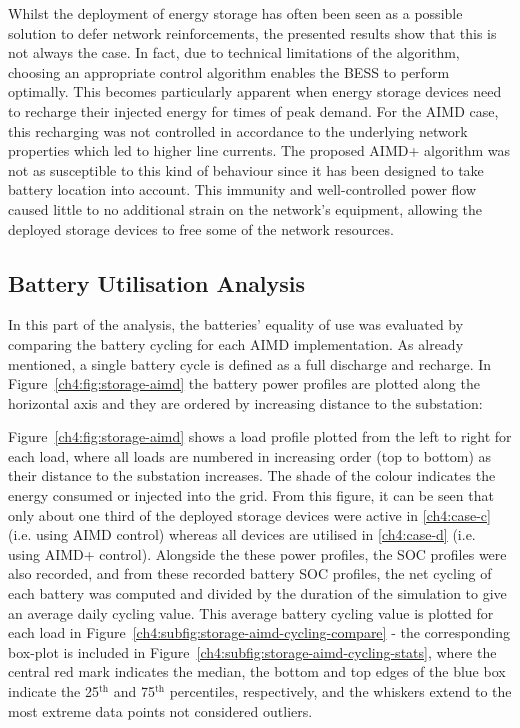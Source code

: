 Whilst the deployment of energy storage has often been seen as a possible solution to defer network reinforcements, the presented results show that this is not always the case.
In fact, due to technical limitations of the algorithm, choosing an appropriate control algorithm enables the BESS to perform optimally.
This becomes particularly apparent when energy storage devices need to recharge their injected energy for times of peak demand.
For the AIMD case, this recharging was not controlled in accordance to the underlying network properties which led to higher line currents.
The proposed AIMD+ algorithm was not as susceptible to this kind of behaviour since it has been designed to take battery location into account.
This immunity and well-controlled power flow caused little to no additional strain on the network's equipment, allowing the deployed storage devices to free some of the network resources.

\subsection{Battery Utilisation Analysis}

In this part of the analysis, the batteries' equality of use was evaluated by comparing the battery cycling for each AIMD implementation.
As already mentioned, a single battery cycle is defined as a full discharge and recharge.
In Figure~\ref{ch4:fig:storage-aimd} the battery power profiles are plotted along the horizontal axis and they are ordered by increasing distance to the substation:



Figure~\ref{ch4:fig:storage-aimd} shows a load profile plotted from the left to right for each load, where all loads are numbered in increasing order (top to bottom) as their distance to the substation increases.
The shade of the colour indicates the energy consumed or injected into the grid.
From this figure, it can be seen that only about one third of the deployed storage devices were active in \ref{ch4:case-c} (i.e. using AIMD control) whereas all devices are utilised in \ref{ch4:case-d} (i.e. using AIMD+ control).
Alongside the these power profiles, the SOC profiles were also recorded, and
from these recorded battery SOC profiles, the net cycling of each battery was computed and divided by the duration of the simulation to give an average daily cycling value.
This average battery cycling value is plotted for each load in Figure~\ref{ch4:subfig:storage-aimd-cycling-compare} - the corresponding box-plot is included in Figure~\ref{ch4:subfig:storage-aimd-cycling-stats}, where the central red mark indicates the median, the bottom and top edges of the blue box indicate the 25$^\text{th}$ and 75$^\text{th}$ percentiles, respectively, and the whiskers extend to the most extreme data points not considered outliers.

